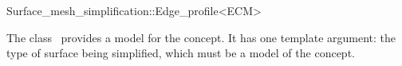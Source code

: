

\begin{ccRefClass}{Surface_mesh_simplification::Edge_profile<ECM>}


\ccDefinition

The class \ccRefName\ provides a model for the  concept.
It has one template argument: the type of surface being simplified,
which must be a model of the  concept.


\ccIsModel
{}

\ccSeeAlso
{}\\
\\

\end{ccRefClass}


